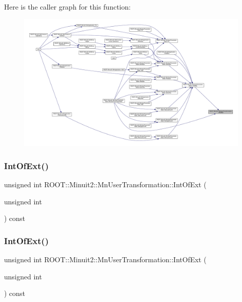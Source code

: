 Here is the caller graph for this function\+:
\nopagebreak
\begin{figure}[H]
\begin{center}
\leavevmode
\includegraphics[width=350pt]{d9/d98/classROOT_1_1Minuit2_1_1MnUserTransformation_a69f58a6d486e2a57789cd8a8445cf23d_icgraph}
\end{center}
\end{figure}
\mbox{\label{classROOT_1_1Minuit2_1_1MnUserTransformation_a69f58a6d486e2a57789cd8a8445cf23d}} 
\subsubsection{\texorpdfstring{IntOfExt()}{IntOfExt()}\hspace{0.1cm}{\footnotesize\ttfamily [2/3]}}
{\footnotesize\ttfamily unsigned int R\+O\+O\+T\+::\+Minuit2\+::\+Mn\+User\+Transformation\+::\+Int\+Of\+Ext (\begin{DoxyParamCaption}\item[{unsigned int}]{ }\end{DoxyParamCaption}) const}

\mbox{\label{classROOT_1_1Minuit2_1_1MnUserTransformation_a69f58a6d486e2a57789cd8a8445cf23d}} 
\subsubsection{\texorpdfstring{IntOfExt()}{IntOfExt()}\hspace{0.1cm}{\footnotesize\ttfamily [3/3]}}
{\footnotesize\ttfamily unsigned int R\+O\+O\+T\+::\+Minuit2\+::\+Mn\+User\+Transformation\+::\+Int\+Of\+Ext (\begin{DoxyParamCaption}\item[{unsigned int}]{ }\end{DoxyParamCaption}) const}

